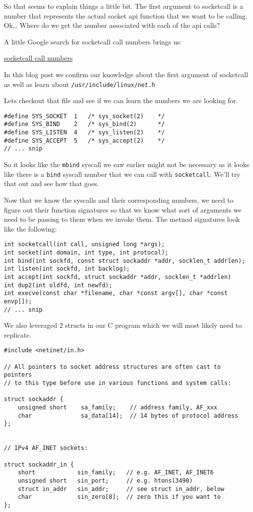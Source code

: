 \documentclass[11pt]{article}
\begin{document}
So that seems to explain things a little bit. The first argument to
socketcall is a number that represents the actual socket api function
that we want to be calling. Ok\ldots{} Where do we get the number associated
with each of the api calls?

A little Google search for socketcall call numbers brings us:

\href{http://jkukunas.blogspot.com/2010/05/x86-linux-networking-system-calls.html}{socketcall call numbers}

In this blog post we confirm our knowledge about the first argument of
socketcall as well as learn about \verb~/usr/include/linux/net.h~

Lets checkout that file and see if we can learn the numbers we are looking
for.

\begin{verbatim}
#define SYS_SOCKET  1   /* sys_socket(2)    */
#define SYS_BIND    2   /* sys_bind(2)      */
#define SYS_LISTEN  4   /* sys_listen(2)    */
#define SYS_ACCEPT  5   /* sys_accept(2)    */
// ... snip
\end{verbatim}

So it looks like the \verb~mbind~ syscall we saw earlier might not be
necessary as it looks like there is a \verb~bind~ syscall number that we
can call with \verb~socketcall~.  We'll try that out and see how that goes.

Now that we know the syscalls and their corresponding numbers, we need
to figure out their function signatures so that we know what sort of
arguments we need to be passing to them when we invoke them. The
metnod signatures look like the following:


\begin{verbatim}
int socketcall(int call, unsigned long *args);
int socket(int domain, int type, int protocol);
int bind(int sockfd, const struct sockaddr *addr, socklen_t addrlen);
int listen(int sockfd, int backlog);
int accept(int sockfd, struct sockaddr *addr, socklen_t *addrlen)
int dup2(int oldfd, int newfd);
int execve(const char *filename, char *const argv[], char *const envp[]);
// ... snip
\end{verbatim}

We also leveraged 2 structs in our C program which we will most likely need
to replicate.

\begin{verbatim}
#include <netinet/in.h>

// All pointers to socket address structures are often cast to pointers
// to this type before use in various functions and system calls:

struct sockaddr {
    unsigned short    sa_family;    // address family, AF_xxx
    char              sa_data[14];  // 14 bytes of protocol address
};


// IPv4 AF_INET sockets:

struct sockaddr_in {
    short            sin_family;   // e.g. AF_INET, AF_INET6
    unsigned short   sin_port;     // e.g. htons(3490)
    struct in_addr   sin_addr;     // see struct in_addr, below
    char             sin_zero[8];  // zero this if you want to
};
\end{verbatim}
\end{document}
